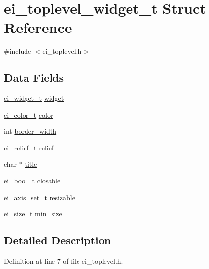 \hypertarget{structei__toplevel__widget__t}{
\section{ei\_\-toplevel\_\-widget\_\-t Struct Reference}
\label{structei__toplevel__widget__t}
}


{\ttfamily \#include $<$ei\_\-toplevel.h$>$}\subsection*{Data Fields}
\begin{DoxyCompactItemize}
\item 
\hyperlink{structei__widget__t}{ei\_\-widget\_\-t} \hyperlink{structei__toplevel__widget__t_a72894e216cd78fbfe56f6e834ece4385}{widget}
\item 
\hyperlink{structei__color__t}{ei\_\-color\_\-t} \hyperlink{structei__toplevel__widget__t_a2d580b44e8d350f1b6d5af8d84802bc0}{color}
\item 
int \hyperlink{structei__toplevel__widget__t_a6f8b26f1614ee8f1e552e6792d49e90b}{border\_\-width}
\item 
\hyperlink{ei__types_8h_aa79a32b1d8ece0e44cfa394e870b270b}{ei\_\-relief\_\-t} \hyperlink{structei__toplevel__widget__t_a92adf50fe36268b41d17024ee6338ce0}{relief}
\item 
char $\ast$ \hyperlink{structei__toplevel__widget__t_a6ed66d8c09149914ebf42fd122df33dc}{title}
\item 
\hyperlink{ei__types_8h_a383b9af13bd6a0a893096ead3c4d8e28}{ei\_\-bool\_\-t} \hyperlink{structei__toplevel__widget__t_a1710c07d0ecdc5129c984cc98ec08507}{closable}
\item 
\hyperlink{ei__types_8h_ab5d9ff46ba9b2c9fa6d6fbd2594c6439}{ei\_\-axis\_\-set\_\-t} \hyperlink{structei__toplevel__widget__t_a2f1fffc879dd73e27a0b70ff3a152fc5}{resizable}
\item 
\hyperlink{structei__size__t}{ei\_\-size\_\-t} \hyperlink{structei__toplevel__widget__t_ae41d0fe8cf4a4a5a52de040eff29f60a}{min\_\-size}
\end{DoxyCompactItemize}


\subsection{Detailed Description}


Definition at line 7 of file ei\_\-toplevel.h.

